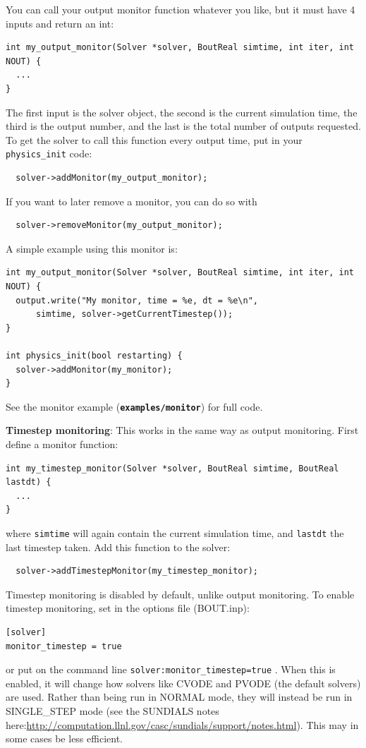 \documentclass[12pt]{article}
\newcommand{\file}[1]{\texttt{\bf #1}}
\begin{document}
You can call your output monitor function whatever you like, but it must have 4
inputs and return an int:
%
\begin{lstlisting}
int my_output_monitor(Solver *solver, BoutReal simtime, int iter, int NOUT) {
  ...
}
\end{lstlisting}
%
The first input is the solver object, the second is the current simulation
time, the third is the output number, and the last is the total number of
outputs requested. To get the solver to call this function every output time,
put in your
%
\lstinline!physics_init!
%
 code:
%
\begin{lstlisting}
  solver->addMonitor(my_output_monitor);
\end{lstlisting}
%
If you want to later remove a monitor, you can do so with
%
\begin{lstlisting}
  solver->removeMonitor(my_output_monitor);
\end{lstlisting}
%
A simple example using this monitor is:
%
\begin{lstlisting}
int my_output_monitor(Solver *solver, BoutReal simtime, int iter, int NOUT) {
  output.write("My monitor, time = %e, dt = %e\n",
      simtime, solver->getCurrentTimestep());
}

int physics_init(bool restarting) {
  solver->addMonitor(my_monitor);
}
\end{lstlisting}
%
See the monitor example (\file{examples/monitor}) for full code.


{\bf Timestep monitoring}: This works in the same way as output monitoring.
First define a monitor function:
%
\begin{lstlisting}
int my_timestep_monitor(Solver *solver, BoutReal simtime, BoutReal lastdt) {
  ...
}
\end{lstlisting}
%
where
%
\lstinline!simtime! will again contain the current simulation time, and
\lstinline!lastdt!
%
 the last timestep taken. Add this function to the solver:
%
\begin{lstlisting}
  solver->addTimestepMonitor(my_timestep_monitor);
\end{lstlisting}
%
Timestep monitoring is disabled by default, unlike output monitoring. To enable
timestep monitoring, set in the options file (BOUT.inp):
%
\begin{lstlisting}
[solver]
monitor_timestep = true
\end{lstlisting}
%
or put on the command line
%
\lstinline!solver:monitor_timestep=true!
%
. When this is enabled, it will change how solvers like CVODE and PVODE (the
default solvers) are used. Rather than being run in NORMAL mode, they will
instead be run in SINGLE\_STEP mode (see the SUNDIALS notes
here:\url{http://computation.llnl.gov/casc/sundials/support/notes.html}). This
may in some cases be less efficient.
\end{document}
